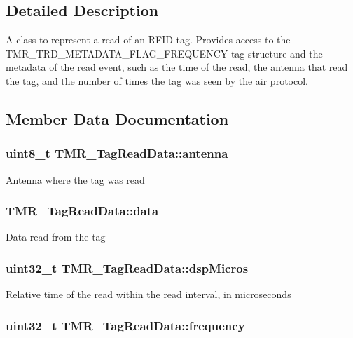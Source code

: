 \subsection{Detailed Description}
A class to represent a read of an RFID tag. Provides access to the TMR\_\-TRD\_\-METADATA\_\-FLAG\_\-FREQUENCY tag structure and the metadata of the read event, such as the time of the read, the antenna that read the tag, and the number of times the tag was seen by the air protocol. 

\subsection{Member Data Documentation}
\hypertarget{struct_t_m_r___tag_read_data_c41eecfa15c3a592253d07b7bb5f3d05}{
\subsubsection[{antenna}]{\setlength{\rightskip}{0pt plus 5cm}uint8\_\-t {\bf TMR\_\-TagReadData::antenna}}}
\label{struct_t_m_r___tag_read_data_c41eecfa15c3a592253d07b7bb5f3d05}


Antenna where the tag was read \hypertarget{struct_t_m_r___tag_read_data_442d5857239434ea3e2811f6d2f527ec}{
\subsubsection[{data}]{ {\bf TMR\_\-TagReadData::data}}}
\label{struct_t_m_r___tag_read_data_442d5857239434ea3e2811f6d2f527ec}


Data read from the tag \hypertarget{struct_t_m_r___tag_read_data_c2872c775dfede488059bad4ff47480c}{
\subsubsection[{dspMicros}]{\setlength{\rightskip}{0pt plus 5cm}uint32\_\-t {\bf TMR\_\-TagReadData::dspMicros}}}
\label{struct_t_m_r___tag_read_data_c2872c775dfede488059bad4ff47480c}


Relative time of the read within the read interval, in microseconds \hypertarget{struct_t_m_r___tag_read_data_74eb597bf1f1e8935d6f4be460239e3e}{
\subsubsection[{frequency}]{\setlength{\rightskip}{0pt plus 5cm}uint32\_\-t {\bf TMR\_\-TagReadData::frequency}}}
\label{struct_t_m_r___tag_read_data_74eb597bf1f1e8935d6f4be460239e3e}


